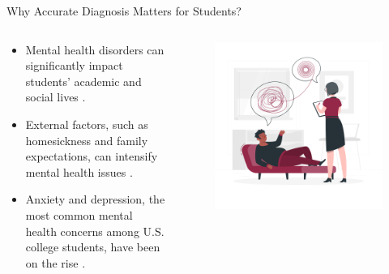 \documentclass[10pt, xcolor=table]{beamer}
\let\olditem\item
\renewcommand\item{\olditem\justifying}
\begin{document}
	
	\begin{frame}{Why Accurate Diagnosis Matters for Students?}
		\begin{columns}
			\begin{column}{0.5\textwidth}
				\begin{itemize}
					\item Mental health disorders can significantly impact students' academic and social lives \cite{HAMORI2023115139}.
					\item External factors, such as homesickness and family expectations, can intensify mental health issues \cite{DEHGHANBONARI2023100238}.
					\item Anxiety and depression, the most common mental health concerns among U.S. college students, have been on the rise \cite{https://doi.org/10.1002/jcad.12543}.
				\end{itemize}
			\end{column}
			\begin{column}{0.5\textwidth}
				\begin{figure}[t]
					\centering
					\includegraphics[width=\linewidth]{./figures/psychologist.png}
				\end{figure}
			\end{column}
		\end{columns}
	\end{frame}
	
\end{document}
